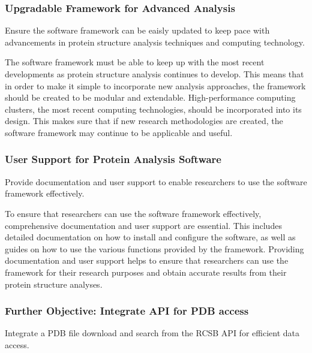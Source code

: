\documentclass[]{final_report}
\begin{document}
\subsubsection{Upgradable Framework for Advanced Analysis}

\begin{displayquote}
    Ensure the software framework can be eaisly updated to keep pace with advancements in protein structure analysis techniques and computing technology.
\end{displayquote}

The software framework must be able to keep up with the most recent developments as protein structure analysis continues to develop. This means that in order to make it simple to incorporate new analysis approaches, the framework should be created to be modular and extendable. High-performance computing clusters, the most recent computing technologies, should be incorporated into its design. This makes sure that if new research methodologies are created, the software framework may continue to be applicable and useful.

\subsubsection{User Support for Protein Analysis Software}

\begin{displayquote}
    Provide documentation and user support to enable researchers to use the software framework effectively.
\end{displayquote}

To ensure that researchers can use the software framework effectively, comprehensive documentation and user support are essential. This includes detailed documentation on how to install and configure the software, as well as guides on how to use the various functions provided by the framework. Providing documentation and user support helps to ensure that researchers can use the framework for their research purposes and obtain accurate results from their protein structure analyses.

\subsubsection{Further Objective: Integrate API for PDB access}

\begin{displayquote}
    Integrate a PDB file download and search from the RCSB API for efficient data access.
\end{displayquote}
\end{document}
